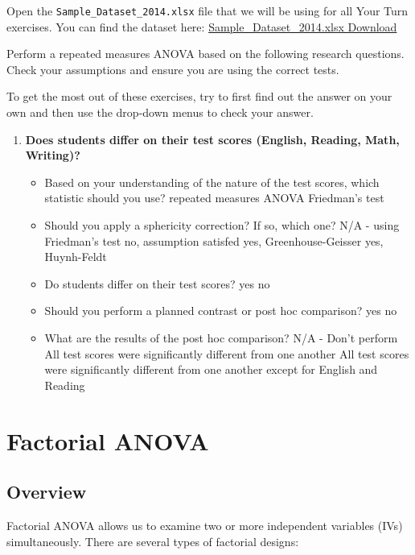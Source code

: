 \documentclass[
]{book}
\begin{document}
Open the \texttt{Sample\_Dataset\_2014.xlsx} file that we will be using for all Your Turn exercises. You can find the dataset here: \href{https://github.com/danawanzer/stats-with-jamovi/blob/master/data/Sample_Dataset_2014.xlsx}{Sample\_Dataset\_2014.xlsx Download}

Perform a repeated measures ANOVA based on the following research questions. Check your assumptions and ensure you are using the correct tests.

To get the most out of these exercises, try to first find out the answer on your own and then use the drop-down menus to check your answer.

\begin{enumerate}
\def\labelenumi{\arabic{enumi}.}
\item
  \textbf{Does students differ on their test scores (English, Reading, Math, Writing)?}

  \begin{itemize}
  \item
    Based on your understanding of the nature of the test scores, which statistic should you use? repeated measures ANOVA Friedman's test
  \item
    Should you apply a sphericity correction? If so, which one? N/A - using Friedman's test no, assumption satisfed yes, Greenhouse-Geisser yes, Huynh-Feldt
  \item
    Do students differ on their test scores? yes no
  \item
    Should you perform a planned contrast or post hoc comparison? yes no
  \item
    What are the results of the post hoc comparison? N/A - Don't perform All test scores were significantly different from one another All test scores were significantly different from one another except for English and Reading
  \end{itemize}
\end{enumerate}

\hypertarget{factorial-anova}{%
\section{Factorial ANOVA}\label{factorial-anova}}

\hypertarget{overview-8}{%
\subsection{Overview}\label{overview-8}}

Factorial ANOVA allows us to examine two or more independent variables (IVs) simultaneously. There are several types of factorial designs:
\end{document}
